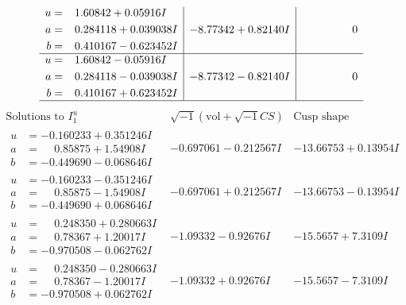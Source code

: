 \documentclass[1p]{elsarticle_modified}
\theoremstyle{definition}
\newcommand{\I}{\sqrt{-1}}
\begin{document}
$$\begin{array}{c|c|c}
\begin{aligned}
u &= \phantom{-}1.60842 + 0.05916 I \\
a &= \phantom{-}0.284118 + 0.039038 I \\
b &= \phantom{-}0.410167 - 0.623452 I\end{aligned}
 & -8.77342 + 0.82140 I & \phantom{-0.000000 } 0 \\ \hline\begin{aligned}
u &= \phantom{-}1.60842 - 0.05916 I \\
a &= \phantom{-}0.284118 - 0.039038 I \\
b &= \phantom{-}0.410167 + 0.623452 I\end{aligned}
 & -8.77342 - 0.82140 I & \phantom{-0.000000 } 0\\
 \hline 
 \end{array}$$\newpage$$\begin{array}{c|c|c}  
\text{Solutions to }I^u_{1}& \I (\text{vol} + \sqrt{-1}CS) & \text{Cusp shape}\\
 \hline 
\begin{aligned}
u &= -0.160233 + 0.351246 I \\
a &= \phantom{-}0.85875 + 1.54908 I \\
b &= -0.449690 - 0.068646 I\end{aligned}
 & -0.697061 - 0.212567 I & -13.66753 + 0.13954 I \\ \hline\begin{aligned}
u &= -0.160233 - 0.351246 I \\
a &= \phantom{-}0.85875 - 1.54908 I \\
b &= -0.449690 + 0.068646 I\end{aligned}
 & -0.697061 + 0.212567 I & -13.66753 - 0.13954 I \\ \hline\begin{aligned}
u &= \phantom{-}0.248350 + 0.280663 I \\
a &= \phantom{-}0.78367 + 1.20017 I \\
b &= -0.970508 - 0.062762 I\end{aligned}
 & -1.09332 - 0.92676 I & -15.5657 + 7.3109 I \\ \hline\begin{aligned}
u &= \phantom{-}0.248350 - 0.280663 I \\
a &= \phantom{-}0.78367 - 1.20017 I \\
b &= -0.970508 + 0.062762 I\end{aligned}
 & -1.09332 + 0.92676 I & -15.5657 - 7.3109 I \\ \hline\begin{aligned}

\end{aligned}
\end{array}$$
\end{document}

